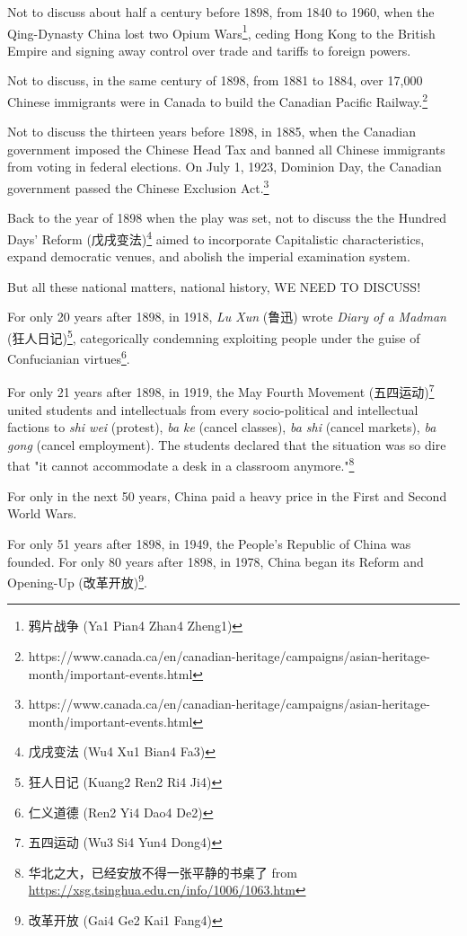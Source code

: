 \documentclass[12pt]{article}
\begin{document}
Not to discuss about half a century before 1898, from 1840 to 1960, when the Qing-Dynasty China lost two Opium Wars\footnote{鸦片战争 (Ya1 Pian4 Zhan4 Zheng1)}, ceding Hong Kong to the British Empire and signing away control over trade and tariffs to foreign powers.

Not to discuss, in the same century of 1898, from 1881 to 1884, over 17,000 Chinese immigrants were in Canada to build the Canadian Pacific Railway.\footnote{https://www.canada.ca/en/canadian-heritage/campaigns/asian-heritage-month/important-events.html}

Not to discuss the thirteen years before 1898, in 1885, when the Canadian government imposed the Chinese Head Tax and banned all Chinese immigrants from voting in federal elections. On July 1, 1923, Dominion Day, the Canadian government passed the Chinese Exclusion Act.\footnote{https://www.canada.ca/en/canadian-heritage/campaigns/asian-heritage-month/important-events.html}


Back to the year of 1898 when the play was set, not to discuss the the Hundred Days' Reform (戊戌变法)\footnote{戊戌变法 (Wu4 Xu1 Bian4 Fa3)} aimed to incorporate Capitalistic characteristics, expand democratic venues, and abolish the imperial examination system.

But all these national matters, national history, WE NEED TO DISCUSS!

For only 20 years after 1898, in 1918, \textit{Lu Xun} (鲁迅) wrote \textit{Diary of a Madman} (狂人日记)\footnote{狂人日记 (Kuang2 Ren2 Ri4 Ji4)}, categorically condemning exploiting people under the guise of Confucianian virtues\footnote{仁义道德 (Ren2 Yi4 Dao4 De2)}.

For only 21 years after 1898, in 1919, the May Fourth Movement (五四运动)\footnote{五四运动 (Wu3 Si4 Yun4 Dong4)} united students and intellectuals from every socio-political and intellectual factions to \textit{shi wei} (protest), \textit{ba ke} (cancel classes), \textit{ba shi} (cancel markets), \textit{ba gong} (cancel employment). The students declared that the situation was so dire that "it cannot accommodate a desk in a classroom anymore."\footnote{华北之大，已经安放不得一张平静的书桌了 from \href{https://xsg.tsinghua.edu.cn/info/1006/1063.htm}{https://xsg.tsinghua.edu.cn/info/1006/1063.htm}}

For only in the next 50 years, China paid a heavy price in the First and Second World Wars.

For only 51 years after 1898, in 1949, the People's Republic of China was founded. For only 80 years after 1898, in 1978, China began its Reform and Opening-Up (改革开放)\footnote{改革开放 (Gai4 Ge2 Kai1 Fang4)}.
\end{document}
